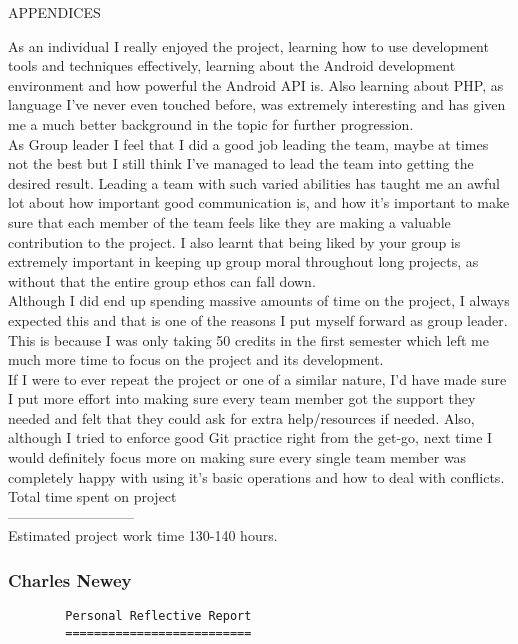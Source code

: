 \documentclass{article}
\begin{document}
\begin{section}{APPENDICES}
\begin{tt}
				As an individual I really enjoyed the project, learning how to use development tools and techniques effectively, learning about the Android development environment and how powerful the Android API is. Also learning about PHP, as language I’ve never even touched before, was extremely interesting and has given me a much better background in the topic for further progression. \\
				As Group leader I feel that I did a good job leading the team, maybe at times not the best but I still think I've managed to lead the team into getting the desired result. Leading a team with such varied abilities has taught me an awful lot about how important good communication is, and how it's important to make sure that each member of the team feels like they are making a valuable contribution to the project. I also learnt that being liked by your group is extremely important in keeping up group moral throughout long projects, as without that the entire group ethos can fall down. \\

				Although I did end up spending massive amounts of time on the project, I always expected this and that is one of the reasons I put myself forward as group leader. This is because I was only taking 50 credits in the first semester which left me much more time to focus on the project and its development. \\

				If I were to ever repeat the project or one of a similar nature, I'd have made sure I put more effort into making sure every team member got the support they needed and felt that they could ask for extra help/resources if needed. Also, although I tried to enforce good Git practice right from the get-go, next time I would definitely focus more on making sure every single team member was completely happy with using it's basic operations and how to deal with conflicts. \\

				Total time spent on project \\
				--------------------------- \\
				Estimated project work time 130-140 hours. \\
				\end{tt}
		
		\clearpage	
		\subsubsection{Charles Newey}
		\begin{verbatim}
		Personal Reflective Report
		==========================


\end{verbatim}
\end{section}
\end{document}
